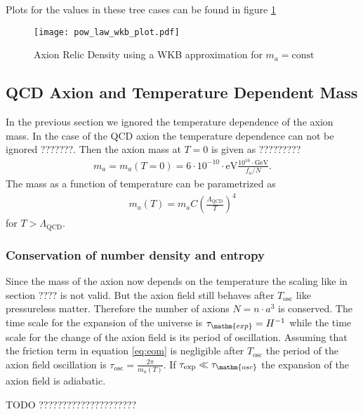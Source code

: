 \documentclass[a4paper]{article}
\begin{document}
Plots for the values in these tree cases can be found in figure \ref{fig:wkb_ard}
\begin{figure}
    \centering
    \texttt{[image: pow\_law\_wkb\_plot.pdf]}
    \caption{Axion Relic Density using a WKB approximation for $m_a = \mathrm{const}$}
    \label{fig:wkb_ard}
\end{figure}

\subsection{QCD Axion and Temperature Dependent Mass}
\label{sec:temerature_dependent_mass}
In the previous section we ignored the temperature dependence of the axion mass.
In the case of the QCD axion the temperature dependence can not be ignored ???????.
Then the axion mass at $T = 0$ is given as ?????????
\begin{align}
    \label{eq:axion_mass_T0}
    m_a = m_a(T = 0) = 6 \cdot 10^{-10} \cdot \mathrm{eV} \frac{10^{16} \cdot \mathrm{GeV}}{f_a / N}.
\end{align}
The mass as a function of temperature can be parametrized as \cite[Sec. 2.1]{Fox:2004kb} 
\begin{align}
    \label{eq:axion_mass1}
    m_a(T) = m_a C \left( \frac{\Lambda_\mathrm{QCD}}{T} \right)^{4}
\end{align}
for $T > \Lambda_\mathrm{QCD}$.

\subsubsection{Conservation of number density and entropy}
Since the mass of the axion now depends on the temperature the scaling like in section ???? is not valid.
But the axion field still behaves after $T_\mathrm{osc}$ like pressureless matter.
Therefore the number of axions $N = n \cdot a^3$ is conserved.
The time scale for the expansion of the universe is $\tau_\mathm{exp} = H^{-1}$ while the time scale
for the change of the axion field is its period of oscillation. Assuming that 
the friction term in equation \ref{eq:eom} is negligible after $T_\mathrm{osc}$
the period of the axion field oscillation is 
$\tau_\mathrm{osc} = \frac{2 \pi}{m_a(T)}$.
If $\tau_\mathrm{exp} \ll \tau_\mathm{osc}$ the expansion of the axion field is adiabatic.

TODO ?????????????????????
\end{document}
